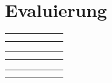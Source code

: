 \section{Evaluierung}


\newcommand{\resulttable}[2]{
    \begin{tabular}{l|r|r|r|r|r}%
        \hline
        \csvreader[head to column names, filter equal={\dataset}{#1}]{results/document_image_segmentation_results.csv}{}%
        {#2}
        \\\hline
        \end
        {tabular}
}

\resulttable{CB55}{\\ \name & \pixelacc & \FgPA & \meanacc & \meanIU & \fwIU}
\resulttable{CSG18}{\\  \pixelacc & \FgPA & \meanacc & \meanIU & \fwIU}
\resulttable{CSG863}{\\  \pixelacc & \FgPA & \meanacc & \meanIU & \fwIU}
